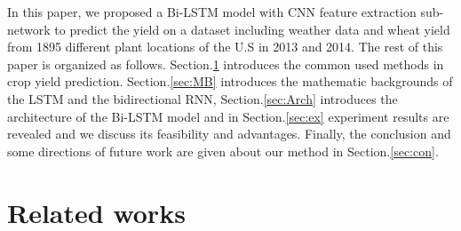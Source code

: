 \documentclass[conference, a4paper]{IEEEtran}
\begin{document}
  In this paper, we proposed a Bi-LSTM model with CNN feature extraction sub-network to predict the yield on a dataset including weather data and wheat yield from 1895 different plant locations of the U.S in 2013 and 2014. The rest of this paper is organized as follows. Section.\ref{sec:RW} introduces the common used methods in crop yield prediction. Section.\ref{sec:MB} introduces the mathematic backgrounds of the LSTM and the bidirectional RNN, Section.\ref{sec:Arch} introduces the architecture of the Bi-LSTM model and in Section.\ref{sec:ex} experiment results are revealed and we discuss its feasibility and advantages. Finally, the conclusion and some directions of future work are given about our method in Section.\ref{sec:con}.

\section{Related works} \label{sec:RW}



\end{document}
